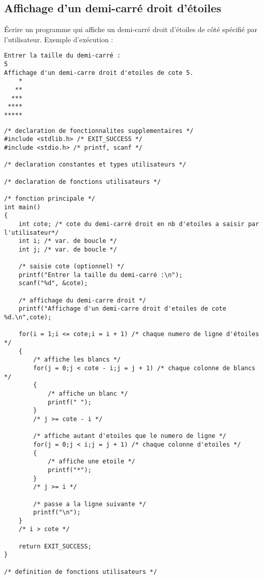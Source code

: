 \subsection{Affichage d'un demi-carré droit d'étoiles}


Écrire un programme qui affiche un demi-carré droit d'étoiles de côté spécifié par l'utilisateur. Exemple d'exécution :
\begin{small}
\begin{verbatim}
Entrer la taille du demi-carré :
5
Affichage d'un demi-carre droit d'etoiles de cote 5.
    *
   **
  ***
 ****
*****
\end{verbatim}
\end{small}

\begin{correction}
\begin{verbatim}
/* declaration de fonctionnalites supplementaires */
#include <stdlib.h> /* EXIT_SUCCESS */
#include <stdio.h> /* printf, scanf */

/* declaration constantes et types utilisateurs */

/* declaration de fonctions utilisateurs */

/* fonction principale */
int main()
{
    int cote; /* cote du demi-carré droit en nb d'etoiles a saisir par l'utilisateur*/
    int i; /* var. de boucle */
    int j; /* var. de boucle */

    /* saisie cote (optionnel) */
    printf("Entrer la taille du demi-carré :\n");
    scanf("%d", &cote);

    /* affichage du demi-carre droit */
    printf("Affichage d'un demi-carre droit d'etoiles de cote %d.\n",cote);

    for(i = 1;i <= cote;i = i + 1) /* chaque numero de ligne d'étoiles */
    {
        /* affiche les blancs */
        for(j = 0;j < cote - i;j = j + 1) /* chaque colonne de blancs */
        {
            /* affiche un blanc */
            printf(" ");
        }
        /* j >= cote - i */

        /* affiche autant d'etoiles que le numero de ligne */
        for(j = 0;j < i;j = j + 1) /* chaque colonne d'etoiles */
        {
            /* affiche une etoile */
            printf("*");
        }
        /* j >= i */

        /* passe a la ligne suivante */
        printf("\n");
    }
    /* i > cote */

    return EXIT_SUCCESS;
}

/* definition de fonctions utilisateurs */

\end{verbatim}
\end{correction}


